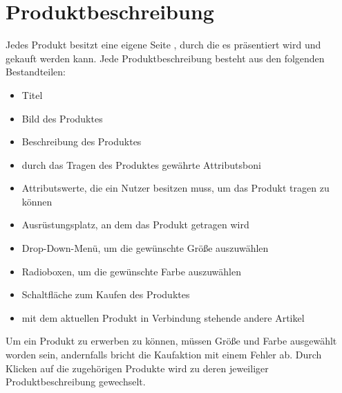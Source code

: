 \section{Produktbeschreibung}
\label{chp:Produktbeschreibung}
Jedes Produkt besitzt eine eigene Seite , durch die es präsentiert wird und gekauft werden kann. Jede Produktbeschreibung besteht aus den folgenden Bestandteilen:
\begin{itemize}
  \item Titel 
  \vspace*{-0.5em}
  \item Bild des Produktes 
  \vspace*{-0.5em}
  \item Beschreibung des Produktes 
  \vspace*{-0.5em}
  \item durch das Tragen des Produktes gewährte Attributsboni 
  \vspace*{-0.5em}
  \item Attributswerte, die ein Nutzer besitzen muss, um das Produkt tragen zu können 
  \vspace*{-0.5em}
  \item Ausrüstungsplatz, an dem das Produkt getragen wird 
  \vspace*{-0.5em}
  \item Drop-Down-Menü, um die gewünschte Größe auszuwählen 
  \vspace*{-0.5em}
  \item Radioboxen, um die gewünschte Farbe auszuwählen 
  \vspace*{-0.5em}
  \item Schaltfläche zum Kaufen des Produktes 
  \vspace*{-0.5em}
  \item mit dem aktuellen Produkt in Verbindung stehende andere Artikel 
\end{itemize}
Um ein Produkt zu erwerben zu können, müssen Größe und Farbe ausgewählt worden sein, andernfalls bricht die Kaufaktion mit einem Fehler ab. Durch Klicken auf die zugehörigen Produkte wird zu deren jeweiliger Produktbeschreibung gewechselt.

